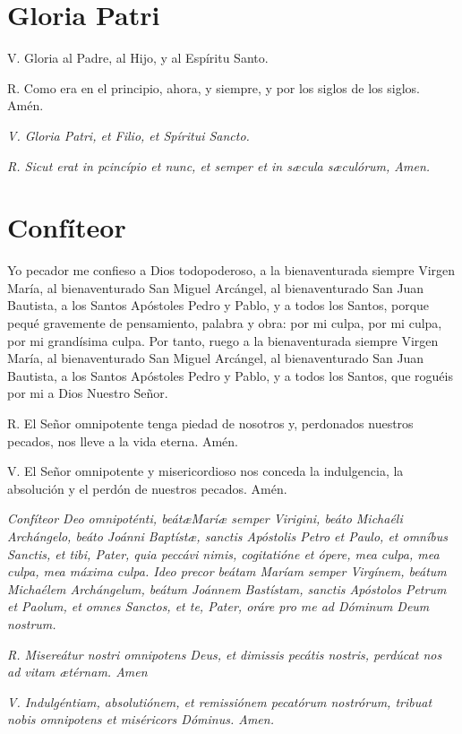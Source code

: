 \documentclass[a4paper,11pt, oneside]{report}
\begin{document}
\section*{Gloria Patri}

V. Gloria al Padre, al Hijo, y al Espíritu Santo.\par
\indent R. Como era en el principio, ahora, y siempre, y por los siglos de los siglos. Amén.

\medskip

\textit{V. Gloria Patri, et Filio, et Spíritui Sancto.}\par
\indent \textit{R. Sicut erat in pcincípio et nunc, et semper et in s{\ae}cula s{\ae}culórum, Amen.}


\section*{Confíteor}\label{sec:confiteor}

Yo pecador me confieso a Dios todopoderoso, a la bienaventurada siempre Virgen María, al bienaventurado San Miguel Arcángel,
al bienaventurado San Juan Bautista, a los Santos Apóstoles Pedro y Pablo, y a todos los Santos, porque pequé gravemente de 
pensamiento, palabra y obra: por mi culpa, por mi culpa, por mi grandísima culpa. Por tanto, ruego a la bienaventurada siempre
Virgen María, al bienaventurado San Miguel Arcángel, al bienaventurado San Juan Bautista, a los Santos Apóstoles Pedro y Pablo,
y a todos los Santos, que roguéis por mi a Dios Nuestro Señor.\par\smallbreak{}
R. El Señor omnipotente tenga piedad de nosotros y, perdonados nuestros pecados, nos lleve a la vida eterna. Amén.\par\smallbreak{}
V. El Señor omnipotente y misericordioso nos conceda la indulgencia, la absolución y el perdón de nuestros pecados. Amén.

\medskip

\textit{Confíteor Deo omnipoténti, beát\ae Marí{\ae} semper Virigini, beáto Michaéli Archángelo, beáto Joánni Baptíst\ae, sanctis Apóstolis
Petro et Paulo, et omníbus Sanctis, et tibi, Pater, quia peccávi nimis, cogitatióne et ópere, mea culpa, mea culpa, mea máxima culpa. Ideo precor
beátam Maríam semper Virgínem, beátum Michaélem Archángelum, beátum Joánnem Bastístam, sanctis Apóstolos Petrum et Paolum, et omnes
Sanctos, et te, Pater, oráre pro me ad Dóminum Deum nostrum.}\par\smallbreak{}
\textit{R. Misereátur nostri omnipotens Deus, et dimissis pecátis nostris, perdúcat nos ad vitam {\ae}térnam. Amen}\par\smallbreak{}
\textit{V. Indulgéntiam, absolutiónem, et remissiónem pecatórum nostrórum, tribuat nobis omnipotens et miséricors Dóminus. Amen.}
\end{document}
